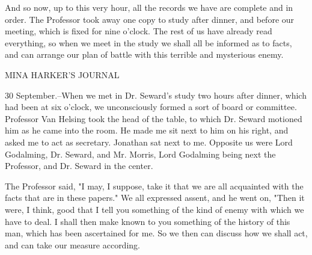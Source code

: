 And so now, up to this very hour, all the records we have are complete and in order. The Professor took away one copy to study after dinner, and before our meeting, which is fixed for nine o'clock. The rest of us have already read everything, so when we meet in the study we shall all be informed as to facts, and can arrange our plan of battle with this terrible and mysterious enemy. 

MINA HARKER'S JOURNAL 

30 September.--When we met in Dr. Seward's study two hours after dinner, which had been at six o'clock, we unconsciously formed a sort of board or committee. Professor Van Helsing took the head of the table, to which Dr. Seward motioned him as he came into the room. He made me sit next to him on his right, and asked me to act as secretary. Jonathan sat next to me. Opposite us were Lord Godalming, Dr. Seward, and Mr. Morris, Lord Godalming being next the Professor, and Dr. Seward in the center. 

The Professor said, "I may, I suppose, take it that we are all acquainted with the facts that are in these papers." We all expressed assent, and he went on, "Then it were, I think, good that I tell you something of the kind of enemy with which we have to deal. I shall then make known to you something of the history of this man, which has been ascertained for me. So we then can discuss how we shall act, and can take our measure according. 

